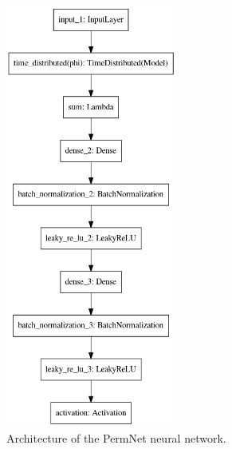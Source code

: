\newpage
\FloatBarrier



\begin{figure}
  \centerfloat
  \includegraphics[width=0.5\textwidth]{figures/quarks/TensorFlow_model.png}
  \caption[PermNet Architecture]
          {Architecture of the PermNet neural network. 
          } 
  \label{fig:q:permnet_architecture}
\end{figure}

\FloatBarrier
\newpage


